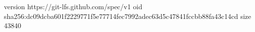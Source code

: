 version https://git-lfs.github.com/spec/v1
oid sha256:dc09dcba601f2229771f5e77714fec7992adec63d5c47841fccbb88fa43c14cd
size 43840
